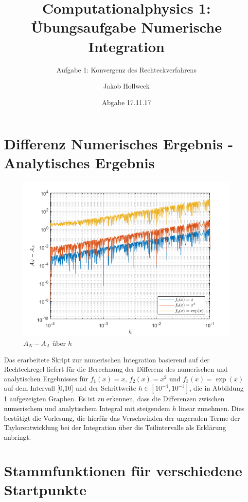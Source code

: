 \documentclass[a4paper, 10pt,onecolumn]{scrartcl}
\title{Computationalphysics 1: Übungsaufgabe Numerische Integration}
\subtitle{Aufgabe 1: Konvergenz des Rechteckverfahrens}
\author{Jakob Hollweck} %
\date{Abgabe 17.11.17}
\begin{document}
\maketitle


\section{Differenz Numerisches Ergebnis - Analytisches Ergebnis}



\begin{figure}[ht!]
	\centering
	\includegraphics[scale=0.5]{Diffs.png}
	\caption{$A_N - A_A$ über $h$} 
	\label{Abbildung1}
\end{figure}

Das erarbeitete Skript zur numerischen Integration basierend auf der Rechteckregel liefert für die Berechnung der Differenz des numerischen und analytischen Ergebnisses für $f_1(x)=x$, $f_2(x)=x^2$ und $f_3(x)=\exp(x)$ auf dem Intervall [0,10] und der Schrittweite $h \in [10^{-4},10^{-1}]$, die in Abbildung \ref{Abbildung1} aufgezeigten Graphen. 
Es ist zu erkennen, dass die Differenzen zwischen numerischem und analytischem Integral mit steigendem $h$ linear zunehmen. Dies bestätigt die Vorlesung, die hierfür das Verschwinden der ungeraden Terme der Taylorentwicklung bei der Integration über die Teilintervalle als Erklärung anbringt. 


\section{Stammfunktionen für verschiedene Startpunkte}
\end{document}

